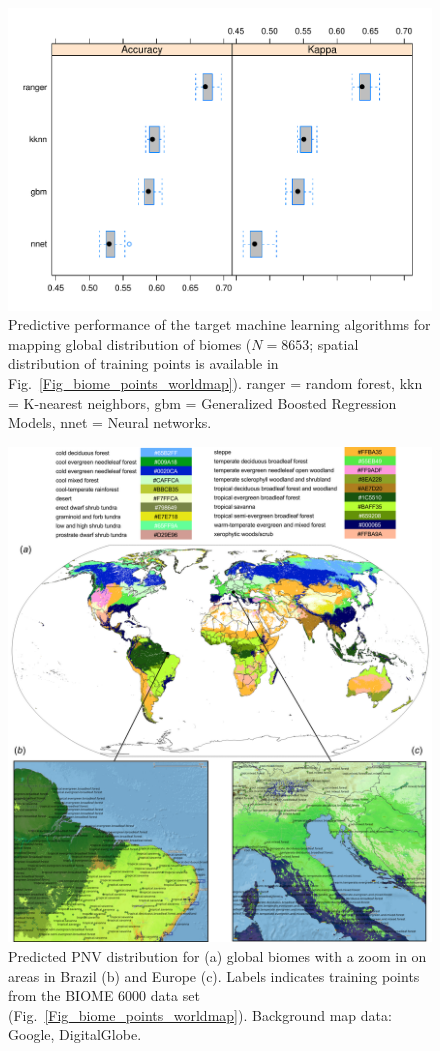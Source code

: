 \documentclass[fleqn,10pt,lineno]{wlpeerj} %
\begin{document}
\begin{figure}[!hbt]
\centering
\includegraphics[width=.7\linewidth]{Fig_5.pdf}
\caption{Predictive performance of the target machine learning algorithms for mapping global distribution of biomes ($N=8653$; spatial distribution of training points is available in Fig.\@~\ref{Fig_biome_points_worldmap}). \textsf{ranger} = random forest, \textsf{kkn} = K-nearest neighbors, \textsf{gbm} = Generalized Boosted Regression Models, \textsf{nnet} = Neural networks.}
\label{Fig_boxplot_biomes_accuracy}
\end{figure}

\begin{figure}[!hp]
\centering
\includegraphics[width=\linewidth]{Fig_6.png}
\caption{Predicted PNV distribution for (a) global biomes with a zoom in on areas in Brazil (b) and Europe (c). Labels indicates training points from the BIOME 6000 data set (Fig.\@~\ref{Fig_biome_points_worldmap}). Background map data: Google, DigitalGlobe.}
\label{Fig_global_biomes_map}
\end{figure}
\end{document}
